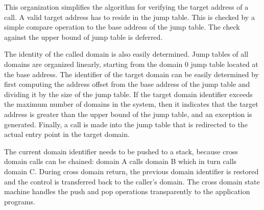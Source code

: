 This organization simplifies the algorithm for verifying the target address of a call.
%
A valid target address has to reside in the jump table.
%
This is checked by a simple compare operation to the base address of the jump table.
%
The check against the upper bound of jump table is deferred.
%


The identity of the called domain is also easily determined.
%
Jump tables of all domains are organized linearly, starting from the domain 0 jump table located at the base address.
%
The identifier of the target domain can be easily determined by first computing the address offset from the base address of the jump table and dividing it by the size of the jump table.
%
If the target domain identifier exceeds the maximum number of domains in the system, then it indicates that the target address is greater than the upper bound of the jump table, and an exception is generated.
%
Finally, a call is made into the jump table that is redirected to the actual entry point in the target domain.
%

The current domain identifier needs to be pushed to a stack, because cross domain calls can be chained: domain A calls domain B which in turn calls domain C.
%
During cross domain return, the previous domain identifier is restored and the control is transferred back to the caller's domain.
%
The cross domain state machine handles the push and pop operations transparently to the application programs.
%
%
%
%
%
%
%
%
%
%
%
%

